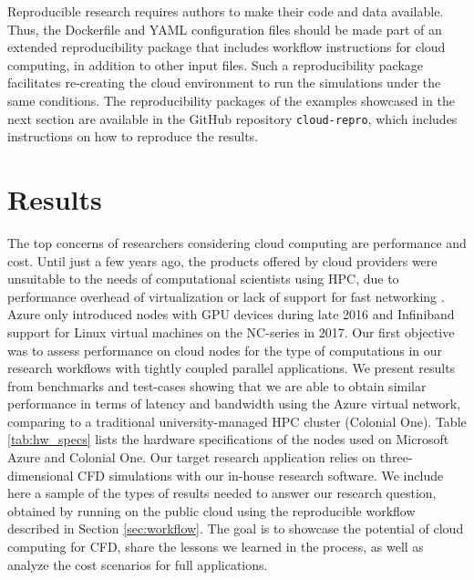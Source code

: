 \documentclass[10pt,journal,compsoc]{IEEEtran}
\begin{document}
Reproducible research requires authors to make their code and data available.
Thus, the Dockerfile and YAML configuration files should be made part of an extended reproducibility package that includes workflow instructions for cloud computing, in addition to other input files.
Such a reproducibility package facilitates re-creating the cloud environment to run the simulations under the same conditions.
The reproducibility packages of the examples showcased in the next section are available in the GitHub repository \texttt{cloud-repro}, which includes instructions on how to reproduce the results.



\section{Results}\label{sec:results}

The top concerns of researchers considering cloud computing are performance and cost. 
Until just a few years ago, the products offered by cloud providers were unsuitable to the needs of computational scientists using HPC, due to performance overhead of virtualization or lack of support for fast networking \cite{freniere_et_2016}.
Azure only introduced nodes with GPU devices during late 2016 and Infiniband support for Linux virtual machines on the NC-series in 2017.
Our first objective was to assess performance on cloud nodes for the type of computations in our research workflows with  tightly coupled parallel applications. 
We present results from benchmarks and test-cases showing that we are able to obtain similar performance in terms of latency and bandwidth using the Azure virtual network, comparing to a traditional university-managed HPC cluster (Colonial One).
Table \ref{tab:hw_specs} lists the hardware specifications of the nodes used on Microsoft Azure and Colonial One.
Our target research application relies on three-dimensional CFD simulations with our in-house research software. We include here a sample of the types of results needed to answer our research question, obtained by running on the public cloud using the reproducible workflow described in Section \ref{sec:workflow}.
The goal is to showcase the potential of cloud computing for CFD, share the lessons we learned in the process, as well as analyze the cost scenarios for full applications.
\end{document}
